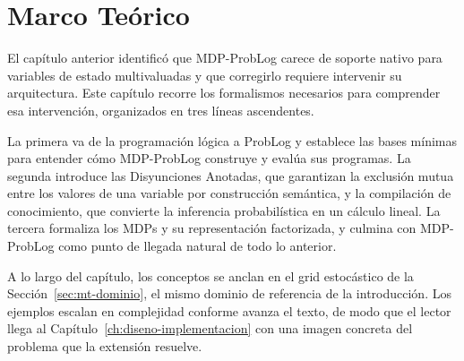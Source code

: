 


\section{Marco Teórico}
\label{ch:marco-teorico}

El capítulo anterior identificó que MDP-ProbLog carece de soporte nativo para variables de estado multivaluadas y que corregirlo requiere intervenir su arquitectura. Este capítulo recorre los formalismos necesarios para comprender esa intervención, organizados en tres líneas ascendentes.

La primera va de la programación lógica a ProbLog y establece las bases mínimas para entender cómo MDP-ProbLog construye y evalúa sus programas. La segunda introduce las Disyunciones Anotadas, que garantizan la exclusión mutua entre los valores de una variable por construcción semántica, y la compilación de conocimiento, que convierte la inferencia probabilística en un cálculo lineal. La tercera formaliza los MDPs y su representación factorizada, y culmina con MDP-ProbLog como punto de llegada natural de todo lo anterior.

A lo largo del capítulo, los conceptos se anclan en el grid estocástico de la Sección~\ref{sec:mt-dominio}, el mismo dominio de referencia de la introducción. Los ejemplos escalan en complejidad conforme avanza el texto, de modo que el lector llega al Capítulo~\ref{ch:diseno-implementacion} con una imagen concreta del problema que la extensión resuelve.


